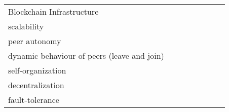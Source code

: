 \begin{tabular}{m{2.8cm}lllllll}
\multicolumn{8}{l}{\cellcolor[HTML]{C0C0C0}Blockchain Infrastructure}                                                                                                                                                                                                                                                                                                            \\
scalability                                 & \multicolumn{1}{c}{}                         & \multicolumn{1}{c}{}                          & \multicolumn{1}{c}{}                     & \multicolumn{1}{c}{}                      & \multicolumn{1}{c}{}                       & \multicolumn{1}{c}{}                             & \multicolumn{1}{c}{}                         \\
peer autonomy                               & \multicolumn{1}{c}{}                         & \multicolumn{1}{c}{}                          & \multicolumn{1}{c}{}                     & \multicolumn{1}{c}{}                      & \multicolumn{1}{c}{}                       & \multicolumn{1}{c}{}                             & \multicolumn{1}{c}{}                         \\
dynamic behaviour of peers (leave and join) & \multicolumn{1}{c}{}                         & \multicolumn{1}{c}{}                          & \multicolumn{1}{c}{}                     & \multicolumn{1}{c}{}                      & \multicolumn{1}{c}{}                       & \multicolumn{1}{c}{}                             & \multicolumn{1}{c}{}                         \\
self-organization                           &                                              &                                               &                                          &                                           &                                            &                                                  &                                              \\
decentralization                            &                                              &                                               &                                          &                                           &                                            &                                                  &                                              \\
fault-tolerance                             &                                              &                                               &                                          &                                           &                                            &                                                  &                                              \\

\end{tabular}
